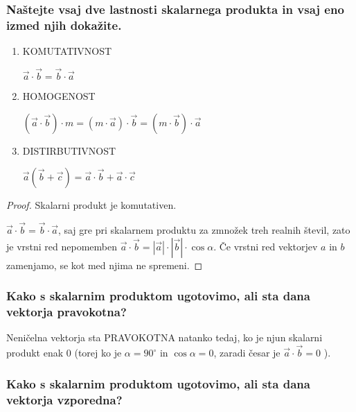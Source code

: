 \documentclass{article}
\begin{document}
\subsubsection*{Naštejte vsaj dve lastnosti skalarnega produkta in vsaj eno izmed njih dokažite.}

\begin{enumerate}
\item KOMUTATIVNOST

$\overrightarrow{a} \cdot \overrightarrow{b}=\overrightarrow{b} \cdot \overrightarrow{a}$

\item  HOMOGENOST

$(\overrightarrow{a} \cdot \overrightarrow{b}) \cdot m=(m \cdot \overrightarrow{a}) \cdot \overrightarrow{b}=(m \cdot \overrightarrow{b}) \cdot \overrightarrow{a}$

\item  DISTIRBUTIVNOST

$\overrightarrow{a}(\overrightarrow{b}+\overrightarrow{c})=\overrightarrow{a} \cdot \overrightarrow{b}+\overrightarrow{a} \cdot \overrightarrow{c}$
\end{enumerate}

\begin{proof}
    Skalarni produkt je komutativen.

   $\overrightarrow{a} \cdot \overrightarrow{b}=\overrightarrow{b} \cdot \overrightarrow{a}$, saj gre pri skalarnem produktu za zmnožek treh realnih števil, zato je vrstni red nepomemben $\vec{a} \cdot \vec{b}=|\vec{a}| \cdot|\vec{b}| \cdot \cos \alpha$. Če vrstni red vektorjev $a$ in $b$ zamenjamo, se kot med njima ne spremeni.
\end{proof}

\subsubsection*{Kako s skalarnim produktom ugotovimo, ali sta dana vektorja pravokotna?}

Neničelna vektorja sta PRAVOKOTNA natanko tedaj, ko je njun skalarni produkt enak 0 (torej ko je $\alpha=90^{\circ}$ in $\cos \alpha=0$, zaradi česar je $\overrightarrow{a} \cdot \overrightarrow{b}=0$ ).

\subsubsection*{Kako s skalarnim produktom ugotovimo, ali sta dana vektorja vzporedna?}
\end{document}
